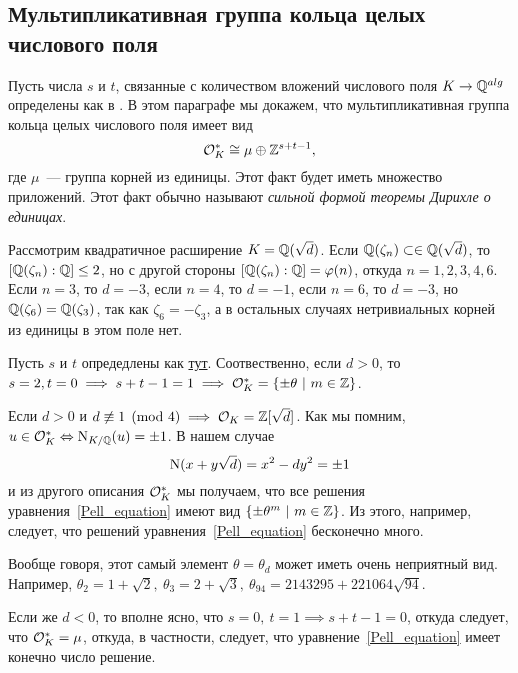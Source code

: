 	
	\subsection{Мультипликативная группа кольца целых числового поля}

	Пусть числа $s$ и $t$, связанные с количеством вложений числового поля $K \to \mathbb{Q}^{alg}$ определены как в \hyperlink{real_and_complex_inclusions}{}. В этом параграфе мы докажем, что мультипликативная группа кольца целых числового поля имеет вид 
	\[
		\mathcal{O}_{K}^{*} \cong \mu \oplus \mathbb{Z}^{s + t - 1},
	\]
	где $\mu$~--- группа корней из единицы. Этот факт будет иметь множество приложений. 
	Этот факт обычно называют \emph{сильной формой теоремы Дирихле о единицах}.
	

	\begin{example}
		Рассмотрим квадратичное расширение $K = \mathbb{Q}(\sqrt{d})$. Если $\mathbb{Q}(\zeta_n) \subset \in \mathbb{Q}(\sqrt{d})$, то $[\mathbb{Q}(\zeta_n) : \mathbb{Q}] \le 2$, но с другой стороны $[\mathbb{Q}(\zeta_n) : \mathbb{Q}] = \varphi(n)$, откуда $n = 1, 2, 3, 4, 6$.  Если $n = 3$, то $d = -3$, если $n = 4$, то $d = -1$, если $n = 6$, то $d = -3$, но $\mathbb{Q}(\zeta_6) = \mathbb{Q}(\zeta_3)$, так как $\zeta_6 = -\zeta_3$, а в остальных случаях нетривиальных корней из единицы в этом поле нет. 

		Пусть $s$ и $t$ опредедлены как \hyperlink{real_and_complex_inclusions}{тут}. Соотвественно, если $d > 0$, то $s = 2, t = 0 \implies s + t - 1 = 1 \implies \mathcal{O}_{K}^{*} = \{ \pm \theta \ \vert \ m \in \mathbb{Z}\}$.

		Если $d > 0$ и $d \not\equiv 1 \pmod{4} \implies \mathcal{O}_{K} = \mathbb{Z}[\sqrt{d}]$. Как мы помним, $u \in \mathcal{O}_{K}^{*} \Leftrightarrow \operatorname{\mathrm{N}}_{K/\mathbb{Q}}(u) = \pm 1$. В нашем случае 
		\begin{equation}
			\operatorname{\mathrm{N}}(x + y\sqrt{d}) = x^2 - dy^2 = \pm 1 \label{Pell_equation}
		\end{equation}
		и из другого описания $\mathcal{O}_{K}^{*}$ мы получаем, что все решения уравнения~\eqref{Pell_equation} имеют вид $\{ \pm \theta^{m} \ \vert \ m \in \mathbb{Z} \}$. Из этого, например, следует, что решений уравнения~\eqref{Pell_equation} бесконечно много. 

		Вообще говоря, этот самый элемент $\theta = \theta_{d}$ может иметь очень неприятный вид. Например, $\theta_2 = 1 + \sqrt{2}, \ \theta_3 = 2 + \sqrt{3}, \ \theta_{94} = 2143295 + 221064\sqrt{94}$.

		Если же $d < 0$, то вполне ясно, что $s = 0, \ t = 1 \implies s + t - 1 = 0$, откуда следует, что $\mathcal{O}_{K}^{*} = \mu$, откуда, в частности, следует, что уравнение~\eqref{Pell_equation} имеет конечно число решение.
	\end{example}

